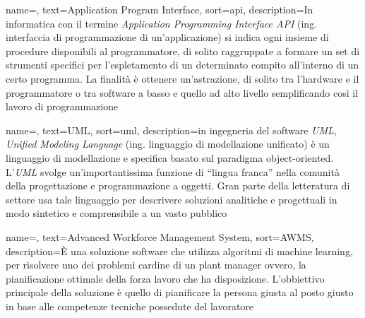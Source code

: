 
\renewcommand{\acronymname}{Acronimi e abbreviazioni}

    


\renewcommand{\glossaryname}{Glossario}

{
    name=,
    text=Application Program Interface,
    sort=api,
    description={In informatica con il termine \emph{Application Programming Interface API} (ing. interfaccia di programmazione di un'applicazione) si indica ogni insieme di procedure disponibili al programmatore, di solito raggruppate a formare un set di strumenti specifici per l'espletamento di un determinato compito all'interno di un certo programma. La finalità è ottenere un'astrazione, di solito tra l'hardware e il programmatore o tra software a basso e quello ad alto livello semplificando così il lavoro di programmazione}
}

{
    name=,
    text=UML,
    sort=uml,
    description={in ingegneria del software \emph{UML, Unified Modeling Language} (ing. linguaggio di modellazione unificato) è un linguaggio di modellazione e specifica basato sul paradigma object-oriented. L'\emph{UML} svolge un'importantissima funzione di ``lingua franca'' nella comunità della progettazione e programmazione a oggetti. Gran parte della letteratura di settore usa tale linguaggio per descrivere soluzioni analitiche e progettuali in modo sintetico e comprensibile a un vasto pubblico}
}

{
	name=,
	text=Advanced Workforce Management System,
	sort=AWMS,
	description={È una soluzione software che utilizza algoritmi di \gls{machine learning}, per risolvere uno dei problemi cardine di un \gls{plant manager} ovvero, la pianificazione ottimale della forza lavoro che ha disposizione. L'obbiettivo principale della soluzione è quello di pianificare la persona giusta al posto giusto in base alle competenze tecniche possedute del lavoratore}
}

